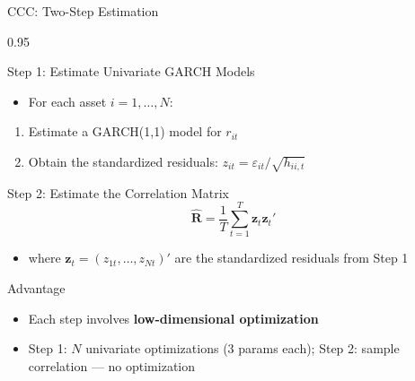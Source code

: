 \documentclass[9pt, aspectratio=169, t]{beamer}
\begin{document}
\begin{frame}{CCC: Two-Step Estimation}
    \begin{cminipage}{0.95\textwidth}
    \vspace{-3mm}
    {\scriptsize
    \begin{block}{Step 1: Estimate Univariate GARCH Models}
        \begin{itemize}\setlength{\itemsep}{0pt}
            \item For each asset $i = 1, \ldots, N$:
        \end{itemize}
        \begin{enumerate}\setlength{\itemsep}{0pt}
            \item Estimate a GARCH(1,1) model for $r_{it}$
            \item Obtain the standardized residuals: $z_{it} = \varepsilon_{it} / \sqrt{h_{ii,t}}$
        \end{enumerate}
    \end{block}
    \begin{block}{Step 2: Estimate the Correlation Matrix}
        \vspace{-1mm}
        \[
            \hat{\mathbf{R}} = \frac{1}{T}\sum_{t=1}^T \mathbf{z}_t\mathbf{z}_t'
        \]
        \vspace{-2mm}
        \begin{itemize}\setlength{\itemsep}{0pt}
            \item where $\mathbf{z}_t = (z_{1t}, \ldots, z_{Nt})'$ are the standardized residuals from Step 1
        \end{itemize}
    \end{block}
    \begin{alertblock}{Advantage}
        \begin{itemize}\setlength{\itemsep}{0pt}
            \item Each step involves \textbf{low-dimensional optimization}
            \item Step 1: $N$ univariate optimizations (3 params each); Step 2: sample correlation --- no optimization
        \end{itemize}
    \end{alertblock}
    }
    \end{cminipage}
\end{frame}
\end{document}
